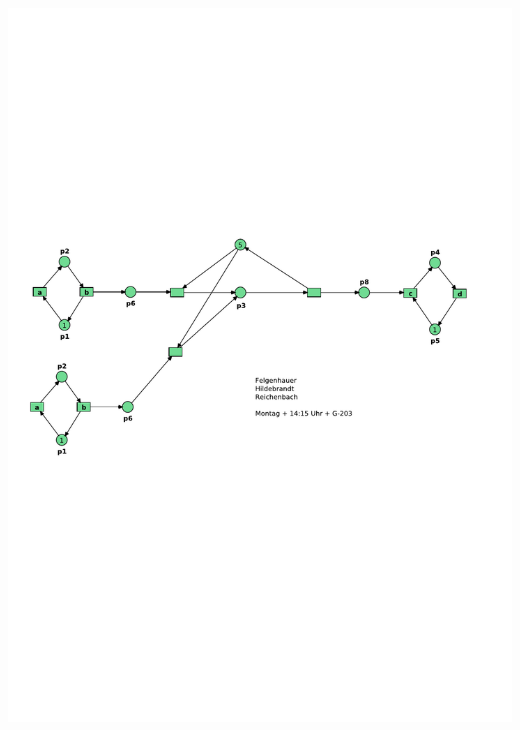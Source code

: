 \documentclass[12pt,a4paper]{../krautsourcing/homework}
\begin{document}
\subsection{}
\includegraphics[scale=0.8,trim={5mm 110mm 15mm 90mm},clip]{Aufgabe_6-4/Aufgabe_6-4-5.pdf}

\newpage
\end{document}
